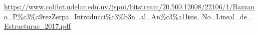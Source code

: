

\setcounter{secnumdepth}{2}

\addto{}


\usepackage{url}
\urldef\urlPrimeraEdicion\url{https://www.colibri.udelar.edu.uy/jspui/bitstream/20.500.12008/22106/1/Bazzano_P%c3%a9rezZerpa_Introducci%c3%b3n_al_An%c3%a1lisis_No_Lineal_de_Estructuras_2017.pdf}
